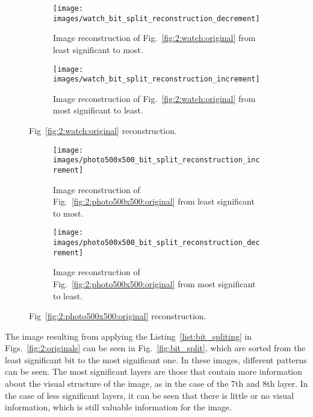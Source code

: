 \documentclass[journal]{IEEEtran}
\begin{document}
\begin{figure}
	\centering
	\begin{subfigure}{0.45\textwidth}
		\centering
		\texttt{[image: images/watch\_bit\_split\_reconstruction\_decrement]} 
		\caption{Image reconstruction of Fig.~\ref{fig:2:watch:original} from least significant to most.}
		\label{fig:watch:bit_split:reconstruction:dec}
	\end{subfigure}
	
	\centering
	\begin{subfigure}{0.45\textwidth}
		\centering
		\texttt{[image: images/watch\_bit\_split\_reconstruction\_increment]} 
		
		\caption{Image reconstruction of Fig.~\ref{fig:2:watch:original} from most significant to least.}
		\label{fig:watch:bit_split:reconstruction:inc}
	\end{subfigure}
	
	\caption{Fig~\ref{fig:2:watch:original} reconstruction.}
	\label{fig:watch:bit_split:reconstruction}
\end{figure}


\begin{figure}
	\centering
	\begin{subfigure}{0.45\textwidth}
		\centering
		\texttt{[image: images/photo500x500\_bit\_split\_reconstruction\_increment]} 
		\caption{Image reconstruction of Fig.~\ref{fig:2:photo500x500:original} from least significant to most.}
		\label{fig:photo500x500:bit_split:reconstruction:dec}
	\end{subfigure}
	
	\centering
	\begin{subfigure}{0.45\textwidth}
		\centering
		\texttt{[image: images/photo500x500\_bit\_split\_reconstruction\_decrement]} 
		
		\caption{Image reconstruction of Fig.~\ref{fig:2:photo500x500:original} from most significant to least.}
		\label{fig:photo500x500:bit_split:reconstruction:inc}
	\end{subfigure}
	
	\caption{Fig~\ref{fig:2:photo500x500:original} reconstruction.}
	\label{fig:photo500x500:bit_split:reconstruction}
\end{figure}


The image resulting from applying the Listing~\ref{list:bit_spliting} in Figs.~\ref{fig:2:originals} can be seen in Fig.~\ref{fig:bit_split}, which are sorted from the least significant bit to the most significant one. In these images, different patterns can be seen. The most significant layers are those that contain more information about the visual structure of the image, as in the case of the 7th and 8th layer. In the case of less significant layers, it can be seen that there is little or no visual information, which is still valuable information for the image.
\end{document}
